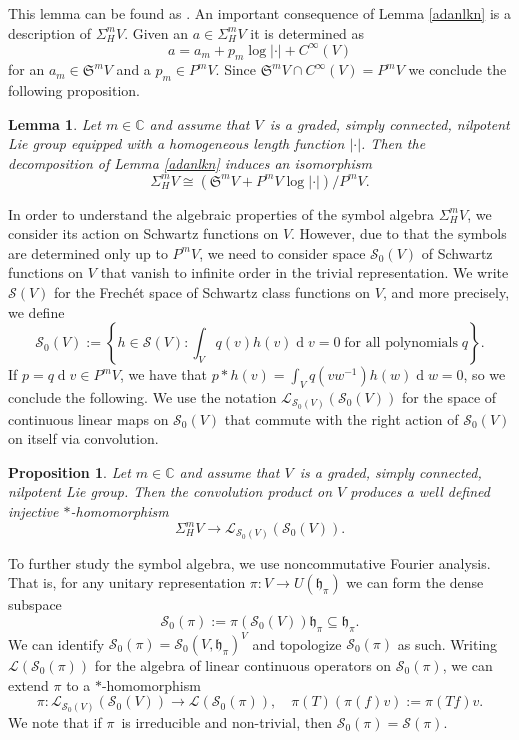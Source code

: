 \documentclass[a4paper,reqno]{amsart}
\numberwithin{equation}{section}
\def\rd{\operatorname{d}\!}
\def\C{\mathbb{C}}
\newtheorem{lemma}[thm]{Lemma}
\newtheorem{prop}[thm]{Proposition}
\theoremstyle{definition}
\theoremstyle{remark}
\begin{document}
This lemma can be found as \cite[Lemma 3.8]{Dave_Haller1}. An important consequence of Lemma \ref{adanlkn} is a description of $\Sigma_H^mV$. Given an $a\in \Sigma_H^mV$ it is determined as 
$$a=a_m+p_m\log|\cdot|+C^\infty(V)$$
for an $a_m\in \mathfrak{S}^mV$ and a $p_m\in P^mV$. Since $\mathfrak{S}^mV\cap C^\infty(V)=P^mV$ we conclude the following proposition.

\begin{lemma}
Let $m\in \C$ and assume that $V$ is a graded, simply connected, nilpotent Lie group equipped with a homogeneous length function $|\cdot|$. Then the decomposition of Lemma \ref{adanlkn} induces an isomorphism
$$\Sigma_H^mV\cong (\mathfrak{S}^mV+P^mV\log|\cdot|)/P^mV.$$
\end{lemma}

In order to understand the algebraic properties of the symbol algebra $\Sigma_H^mV$, we consider its action on Schwartz functions on $V$. However, due to that the symbols are determined only up to $P^mV$, we need to consider space $\mathcal{S}_0(V)$ of Schwartz functions on $V$ that vanish to infinite order in the trivial representation. We write $\mathcal{S}(V)$ for the Frech\'{e}t space of Schwartz class functions on $V$, and more precisely, we define 
$$\mathcal{S}_0(V):=\left\{h\in \mathcal{S}(V): \int_V q(v)h(v)\rd v=0\; \mbox{for all polynomials}\; q\right\}.$$
If $p=q\rd v\in P^mV$, we have that $p*h(v)=\int_V q(vw^{-1})h(w)\rd w=0$, so we conclude the following. We use the notation $\mathcal{L}_{\mathcal{S}_0(V)}(\mathcal{S}_0(V))$ for the space of continuous linear maps on $\mathcal{S}_0(V)$ that commute with the right action of $\mathcal{S}_0(V)$ on itself via convolution.

\begin{prop}
\label{blablaprec}
Let $m\in \C$ and assume that $V$ is a graded, simply connected, nilpotent Lie group. Then the convolution product on $V$ produces a well defined injective $*$-homomorphism
$$\Sigma_H^mV\to \mathcal{L}_{\mathcal{S}_0(V)}(\mathcal{S}_0(V)).$$
\end{prop}


To further study the symbol algebra, we use noncommutative Fourier analysis. That is, for any unitary representation $\pi:V\to U(\mathfrak{h}_\pi)$ we can form the dense subspace
$$\mathcal{S}_0(\pi):=\pi(\mathcal{S}_0(V))\mathfrak{h}_\pi\subseteq \mathfrak{h}_\pi.$$
We can identify $\mathcal{S}_0(\pi)=\mathcal{S}_0(V,\mathfrak{h}_\pi)^V$ and topologize $\mathcal{S}_0(\pi)$ as such. Writing $\mathcal{L}(\mathcal{S}_0(\pi))$ for the algebra of linear continuous operators on $\mathcal{S}_0(\pi)$, we can extend $\pi$ to a $*$-homomorphism
$$\pi:\mathcal{L}_{\mathcal{S}_0(V)}(\mathcal{S}_0(V))\to \mathcal{L}(\mathcal{S}_0(\pi)), \quad \pi(T)(\pi(f)v):=\pi(Tf)v.$$
We note that if $\pi$ is irreducible and non-trivial, then $\mathcal{S}_0(\pi)=\mathcal{S}(\pi)$. 
\end{document}
